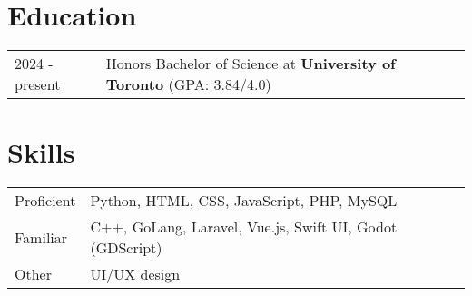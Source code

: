 \documentclass[a4paper,12pt]{article}
\begin{document}
\section{Education}
\begin{tabularx}{\linewidth}{@{}l X@{}}	
2024 - present & Honors Bachelor of Science at \textbf{University of Toronto} \hfill \normalsize (GPA: 3.84/4.0) \\
\end{tabularx}


\section{Skills}
\begin{tabularx}{\linewidth}{@{}l X@{}}
Proficient &  \normalsize{Python, HTML, CSS, JavaScript, PHP, MySQL}\\
Familiar  &  \normalsize{C++, GoLang, Laravel, Vue.js, Swift UI, Godot (GDScript)}\\ 
Other  &  \normalsize{UI/UX design}\\  
\end{tabularx}

\vfill
{}
\end{document}
